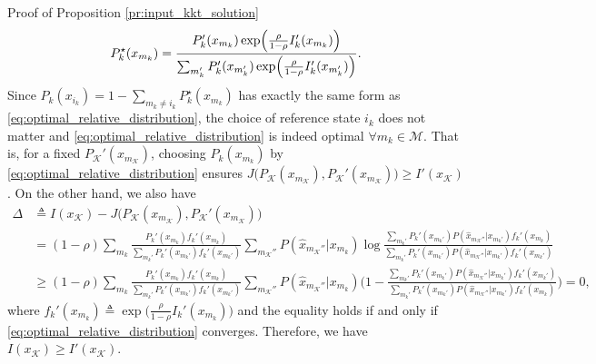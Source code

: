 \documentclass[journal,12pt,onecolumn,draftclsnofoot]{IEEEtran}
\theoremstyle{remark}
\begin{document}
\begin{appendix}
\begin{subsection}{Proof of Proposition \ref{pr:input_kkt_solution}}
		\begin{equation}
			P_k^\star(x_{m_k}) = \frac{P_k'(x_{m_k}) \exp \Bigl( \frac{\rho}{1 - \rho} I_k'(x_{m_k}) \Bigr)}{\sum_{m_k'} P_k'(x_{m_k'}) \exp \Bigl( \frac{\rho}{1 - \rho} I_k'(x_{m_k'}) \Bigr)}.
			\label{eq:optimal_relative_distribution}
		\end{equation}
		Since $P_k(x_{i_k}) = 1 - \sum_{m_k \ne i_k} P_k^\star(x_{m_k})$ has exactly the same form as \eqref{eq:optimal_relative_distribution}, the choice of reference state $i_k$ does not matter and \eqref{eq:optimal_relative_distribution} is indeed optimal $\forall m_k \in \mathcal{M}$.
		That is, for a fixed $P_{\mathcal{K}}'(x_{m_{\mathcal{K}}})$, choosing $P_k(x_{m_k})$ by \eqref{eq:optimal_relative_distribution} ensures $J \bigl( P_{\mathcal{K}}(x_{m_{\mathcal{K}}}),P_{\mathcal{K}}'(x_{m_{\mathcal{K}}}) \bigr) \ge I'(x_{\mathcal{K}})$.
		On the other hand, we also have
		\begin{subequations}
			\label{eq:information_difference_upper}
			\begin{align}
				\Delta
				 & \triangleq I(x_{\mathcal{K}}) - J \bigl( P_{\mathcal{K}}(x_{m_{\mathcal{K}}}),P_{\mathcal{K}}'(x_{m_{\mathcal{K}}}) \bigr)                                                                                                                                                                                                                                                  \\
				 & = (1 - \rho) \sum_{m_k} \frac{P_k'(x_{m_k}) f_k'(x_{m_k})}{\sum_{m_k'} P_k'(x_{m_k'}) f_k'(x_{m_k'})} \sum_{m_{\mathcal{K}}''} P(\hat{x}_{m_{\mathcal{K}}''}|x_{m_k}) \log \frac{\sum_{m_k'} P_k'(x_{m_k'}) P(\hat{x}_{m_{\mathcal{K}}''}|x_{m_k'}) f_k'(x_{m_k})}{\sum_{m_k'} P_k'(x_{m_k'}) P(\hat{x}_{m_{\mathcal{K}}''}|x_{m_k'}) f_k'(x_{m_k'})}                       \\
				 & \ge (1 - \rho) \sum_{m_k} \frac{P_k'(x_{m_k}) f_k'(x_{m_k})}{\sum_{m_k'} P_k'(x_{m_k'}) f_k'(x_{m_k'})} \sum_{m_{\mathcal{K}}''} P(\hat{x}_{m_{\mathcal{K}}''}|x_{m_k}) \Biggl( 1 - \frac{\sum_{m_k'} P_k'(x_{m_k'}) P(\hat{x}_{m_{\mathcal{K}}''}|x_{m_k'}) f_k'(x_{m_k'})}{\sum_{m_k'} P_k'(x_{m_k'}) P(\hat{x}_{m_{\mathcal{K}}''}|x_{m_k'}) f_k'(x_{m_k})} \Biggr) = 0,
			\end{align}
		\end{subequations}
		where $f_k'(x_{m_k}) \triangleq \exp \bigl( \frac{\rho}{1 - \rho} I_k'(x_{m_k}) \bigr)$ and the equality holds if and only if \eqref{eq:optimal_relative_distribution} converges.
		Therefore, we have $I(x_{\mathcal{K}}) \ge I'(x_{\mathcal{K}})$.

\end{subsection}
\end{appendix}
\end{document}
